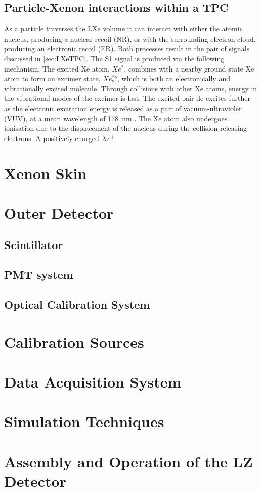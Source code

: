 \subsection{Particle-Xenon interactions within a TPC}
As a particle traverses the LXe volume it can interact with either the atomic nucleus, producing a nuclear recoil (NR), or with the surrounding electron cloud, producing an electronic recoil (ER). Both processes result in the pair of signals discussed in \autoref{sec:LXeTPC}. The S1 signal is produced via the following mechanism. The excited Xe atom, $Xe^{*}$, combines with a nearby ground state Xe atom to form an excimer state, $Xe_{2}^{*\nu}$, which is both an electronically and vibrationally excited molecule. Through collisions with other Xe atoms, energy in the vibrational modes of the excimer is lost. The excited pair de-excites further as the electronic excitation energy is released as a pair of vacuum-ultraviolet (VUV), at a mean wavelength of 178~nm \cite{Schumann:2014uva}.
The Xe atom also undergoes ionisation due to the displacement of the nucleus during the collision releasing electrons. A positively charged $Xe^{+}$ 

\section{Xenon Skin}
\section{Outer Detector}
\subsection{Scintillator}
\subsection{PMT system}
\subsection{Optical Calibration System}

\section{Calibration Sources}

\section{Data Acquisition System}

\section{Simulation Techniques}

\section{Assembly and Operation of the LZ Detector}